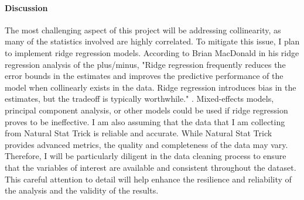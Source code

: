 \documentclass[12pt]{article}
\begin{document}
\paragraph{Discussion}
The most challenging aspect of this project will be addressing collinearity, as many of the statistics involved are highly correlated. 
To mitigate this issue, I plan to implement ridge regression models. According to Brian MacDonald in his ridge regression analysis 
of the plus/minus, "Ridge regression frequently reduces the error bounds in the estimates and improves the predictive performance 
of the model when collinearly exists in the data. Ridge regression introduces bias in the estimates, but the tradeoff is typically 
worthwhile." \citet{Macdonald_2012}. Mixed-effects models, principal component analysis, or other models could be used if ridge regression 
proves to be ineffective. I am also assuming that the data that I am collecting from Natural Stat Trick is reliable and accurate. While 
Natural Stat Trick provides advanced metrics, the quality and completeness of the data may vary.  Therefore, I will be particularly diligent 
in the data cleaning process to ensure that the variables of interest are available and consistent throughout the dataset. This 
careful attention to detail will help enhance the resilience and reliability of the analysis and the validity of the results.




\end{document}
